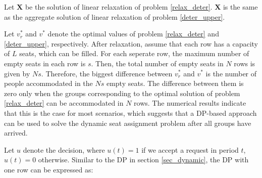 \begin{lem}
 Let $\mathbf{X}$ be the solution of linear relaxation of problem \eqref{relax_deter}. $\mathbf{X}$ is the same as the aggregate
 solution of linear relaxation of problem \eqref{deter_upper}.
\end{lem}





Let $v_{r}^{*}$ and $v^{*}$ denote the optimal values of problem \eqref{relax_deter} and \eqref{deter_upper}, respectively. After relaxation, assume that each row has a capacity of $L$ seats, which can be filled. For each seperate row, the maximum number of empty seats in each row is $s$. Then, the total number of empty seats in $N$ rows is given by $Ns$. Therefore, the biggest difference between $v_{r}^{*}$ and $v^{*}$ is the number of people accommodated in the $Ns$ empty seats.
The difference between them is zero only when the groups corresponding to the optimal solution of problem \eqref{relax_deter} can be accommodated in $N$ rows. The numerical results indicate that this is the case for most scenarios, which suggests that a DP-based approach can be used to solve the dynamic seat assignment problem after all groups have arrived.




Let $u$ denote the decision, where $u(t) = 1$ if we accept a request in period $t$, $u(t) =0$ otherwise. Similar to the DP in section \ref{sec_dynamic}, the DP with one row can be expressed as:

